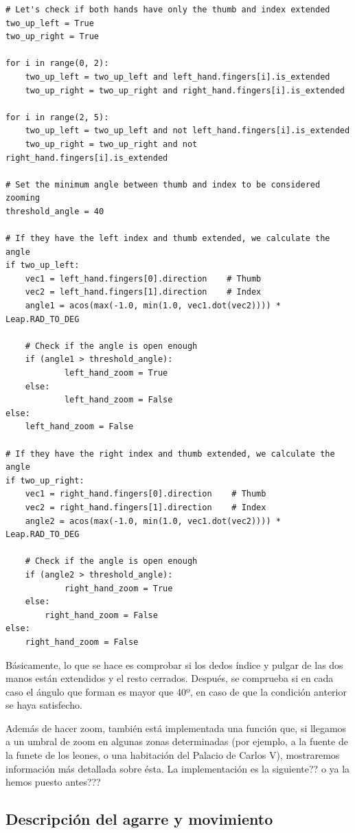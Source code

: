 \documentclass[11pt,a4paper]{article}
\begin{document}
\begin{lstlisting}
# Let's check if both hands have only the thumb and index extended
two_up_left = True
two_up_right = True

for i in range(0, 2):
	two_up_left = two_up_left and left_hand.fingers[i].is_extended
    two_up_right = two_up_right and right_hand.fingers[i].is_extended

for i in range(2, 5):
	two_up_left = two_up_left and not left_hand.fingers[i].is_extended
    two_up_right = two_up_right and not right_hand.fingers[i].is_extended

# Set the minimum angle between thumb and index to be considered zooming
threshold_angle = 40

# If they have the left index and thumb extended, we calculate the angle
if two_up_left:
	vec1 = left_hand.fingers[0].direction    # Thumb
	vec2 = left_hand.fingers[1].direction    # Index
    angle1 = acos(max(-1.0, min(1.0, vec1.dot(vec2)))) * Leap.RAD_TO_DEG

    # Check if the angle is open enough
    if (angle1 > threshold_angle):
    		left_hand_zoom = True
	else:
    		left_hand_zoom = False
else:
	left_hand_zoom = False

# If they have the right index and thumb extended, we calculate the angle
if two_up_right:
	vec1 = right_hand.fingers[0].direction    # Thumb
    vec2 = right_hand.fingers[1].direction    # Index
    angle2 = acos(max(-1.0, min(1.0, vec1.dot(vec2)))) * Leap.RAD_TO_DEG

    # Check if the angle is open enough
    if (angle2 > threshold_angle):
    		right_hand_zoom = True
	else:
		right_hand_zoom = False
else:
	right_hand_zoom = False
\end{lstlisting}

Básicamente, lo que se hace es comprobar si los dedos índice y pulgar de las dos
manos están extendidos y el resto cerrados. Después, se comprueba si en cada
caso el ángulo que forman es mayor que 40º, en caso de que la condición anterior
se haya satisfecho.

Además de hacer zoom, también está implementada una función que, si llegamos a un umbral de zoom en algunas zonas determinadas (por ejemplo,
a la fuente de la funete de los leones, o una habitación del Palacio de Carlos V), mostraremos información más detallada sobre ésta. La
implementación es la siguiente?? o ya la hemos puesto antes???


\subsection{Descripción del agarre y movimiento}
\end{document}
